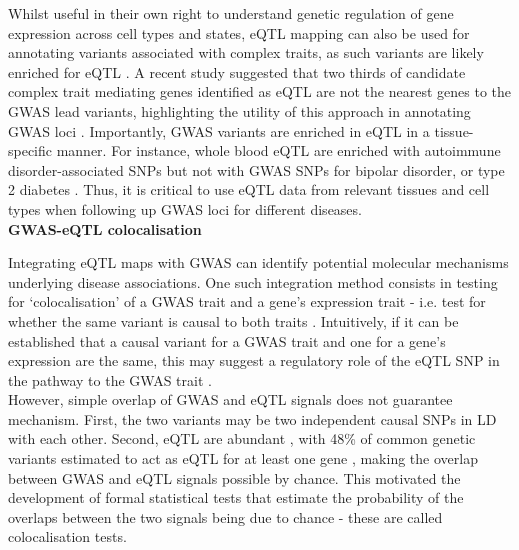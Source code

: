 Whilst useful in their own right to understand genetic regulation of gene expression across cell types and states, eQTL mapping can also be used for annotating variants associated with complex traits, as such variants are likely enriched for eQTL \cite{nicolae2010trait}. 
A recent study suggested that two thirds of candidate complex trait mediating genes identified as eQTL are not the nearest genes to the GWAS lead variants, highlighting the utility of this approach in annotating GWAS loci \cite{zhu2016integration}. 
Importantly, GWAS variants are enriched in eQTL in a tissue-specific manner. 
For instance, whole blood eQTL are enriched with autoimmune disorder-associated SNPs but not with GWAS SNPs for bipolar disorder, or type 2 diabetes \cite{gtex2015genotype}. 
Thus, it is critical to use eQTL data from relevant tissues and cell types when following up GWAS loci for different diseases.\\

\textbf{GWAS-eQTL colocalisation}

Integrating eQTL maps with GWAS can identify potential molecular mechanisms underlying disease associations.
One such integration method consists in testing for `colocalisation' of a GWAS trait and a gene’s expression trait - i.e. test for whether the same variant is causal to both traits \cite{cannon2018deciphering}.
Intuitively, if it can be established that a causal variant for a GWAS trait and one for a gene’s expression are the same, this may suggest a regulatory role of the eQTL SNP in the pathway to the GWAS trait \cite{he2013sherlock, ongen2017estimating}. \\

However, simple overlap of GWAS and eQTL signals does not guarantee mechanism. 
First, the two variants may be two independent causal SNPs in LD with each other.
Second, eQTL are abundant \cite{lappalainen2013transcriptome}, with 48\% of common genetic variants estimated to act as eQTL for at least one gene \cite{liu2019abundant}, making the overlap between GWAS and eQTL signals possible by chance.
This motivated the development of formal statistical tests that estimate the probability of the overlaps between the two signals being due to chance - these are called colocalisation tests. \\

